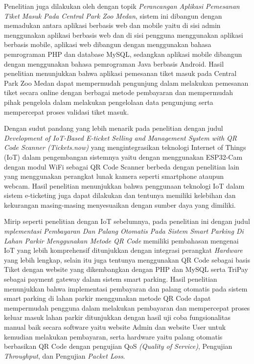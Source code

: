 Penelitian juga dilakukan oleh \cite{akbar2023perancangan} dengan topik \textit{Perancangan Aplikasi Pemesanan Tiket Masuk Pada Central Park Zoo Medan}, sistem ini dibangun dengan memadukan antara aplikasi berbasis web dan mobile yaitu di sisi admin menggunakan aplikasi berbasis web dan di sisi pengguna menggunakan aplikasi berbasis mobile, aplikasi web dibangun dengan menggunakan bahasa pemrograman PHP dan database MySQL, sedangkan aplikasi mobile dibangun dengan menggunakan bahasa pemrograman Java berbasis Android. Hasil penelitian menunjukkan bahwa aplikasi pemesanan tiket masuk pada Central Park Zoo Medan dapat mempermudah pengunjung dalam melakukan pemesanan tiket secara online dengan berbagai metode pembayaran dan mempermudah pihak pengelola dalam melakukan pengelolaan data pengunjung serta mempercepat proses validasi tiket masuk.


Dengan sudut pandang yang lebih menarik pada penelitian \cite{HanJie_Alduais_2023} dengan judul \textit{Development of IoT-Based E-ticket Selling and Management System with QR Code Scanner (Tickets.now)} yang mengintegrasikan teknologi Internet of Things (IoT) dalam pengembangan sistemnya yaitu dengan menggunakan ESP32-Cam dengan modul WiFi sebagai QR Code Scanner berbeda dengan penelitian lain yang menggunakan perangkat lunak kamera seperti smartphone ataupun webcam. Hasil penelitian menunjukkan bahwa penggunaan teknologi IoT dalam sistem e-ticketing juga dapat dilakukan dan tentunya memiliki kelebihan dan kekurangan masing-masing menyesuaikan dengan sumber daya yang dimiliki.

Mirip seperti penelitian dengan IoT sebelumnya, pada penelitian ini \cite{assidiqie2022implementasi} dengan judul \textit{mplementasi Pembayaran Dan Palang Otomatis Pada Sistem Smart Parking Di Lahan Parkir Menggunakan Metode QR Code} memiliki pembahasan mengenai IoT yang lebih komprehensif ditunjukkan dengan integrasi perangkat \textit{Hardware} yang lebih lengkap, selain itu juga tentunya menggunakan QR Code sebagai basis Tiket dengan website yang dikembangkan dengan PHP dan MySQL serta TriPay sebagai payment gateway dalam sistem smart parking. Hasil penelitian menunjukkan bahwa implementasi pembayaran dan palang otomatis pada sistem smart parking di lahan parkir menggunakan metode QR Code dapat mempermudah pengguna dalam melakukan pembayaran dan mempercepat proses keluar masuk lahan parkir ditunjukkan dengan hasil uji coba fungsionalitas manual baik secara software yaitu website Admin dan website User untuk kemudian melakukan pembayaran, serta hardware yaitu palang otomatis berbasikan QR Code dengan pengujian QoS \textit{(Quality of Service)}, Pengujian \textit{Throughput}, dan Pengujian \textit{Packet Loss}.


